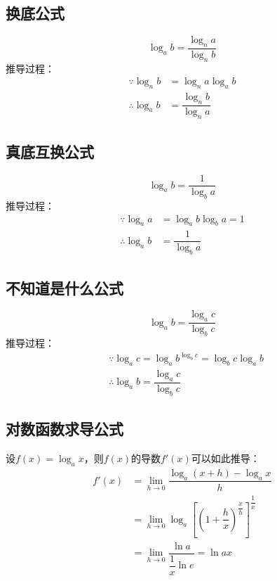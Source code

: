 \documentclass[a4paper, 12pt, draft]{article}
\begin{document}
    \newpage
    \subsection{换底公式}
    \begin{equation}\label{eq1.3}
        \log_{a}{b} = \dfrac{ \log_{n}{a} }{ \log_{n}{b} }
    \end{equation}
    推导过程：
    \[
    \begin{aligned}
        \because    \log_{n}{b} &= \log_{n}{a} \log_{a}{b} \\
        \therefore  \log_{a}{b} &= \dfrac{ \log_{n}{b} }{ \log_{n}{a} }
    \end{aligned}
    \]


    \subsection{真底互换公式}
    \begin{equation}\label{eq1.4}
        \log_{a}{b} = \dfrac{1}{ \log_{b}{a} }
    \end{equation}
    推导过程：
    \[
    \begin{aligned}
        \because    \log_{a}{a} &= \log_{a}{b} \log_{b}{a} = 1 \\
        \therefore  \log_{a}{b} &= \dfrac{1}{ \log_{b}{a} }
    \end{aligned}
    \]


    \subsection[未知公式]{不知道是什么公式}
    \begin{equation}\label{1.5}
        \log_{a}{b} = \dfrac{ \log_{a}{c} }{ \log_{b}{c} }
    \end{equation}
    推导过程：
    \[
    \begin{aligned}
        & \because \log_{a}{c} = \log_{a}{b^{ \log_{b}{c} }} = \log_{b}{c} \log_{a}{b} \\
        & \therefore \log_{a}{b} = \dfrac{ \log_{a}{c} }{ \log_{b}{c} }
    \end{aligned}
    \]

    \subsection[求导公式]{对数函数求导公式}
    设$f(x)=\log_{a}{x}$，则$f(x)$的导数$f'(x)$可以如此推导：
    \begin{equation}
        \begin{aligned}
            f'(x) &= \lim\limits_{h \to 0} \dfrac{\log_{a}{(x + h)} - \log_{a}{x}}{h} \\
              &= \lim\limits_{h \to 0} \log_{a}{\left[ \left( 1 + \dfrac{h}{x} \right)^{\dfrac{x}{h}} \right]^{\dfrac{1}{x}}} \\
              &= \lim\limits_{ h \to 0 } \dfrac{\ln{a}}{\dfrac{1}{x} \ln{e}} = \ln{a}x
        \end{aligned}
    \end{equation}
    
\end{document}
